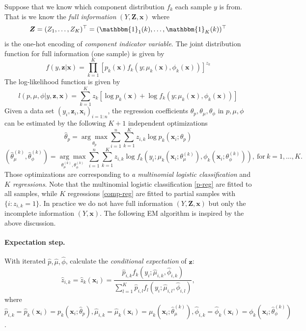 \documentclass[11pt]{article}
\numberwithin{equation}{section}
\def\bx{\boldsymbol{x}}
\def\bZ{\boldsymbol{Z}}
\def\bz{\boldsymbol{z}}
\begin{document}
	Suppose that we know which component distribution $f_k$ each sample $y$ is from. That is we know the \textit{full information} $(Y,\bZ,\bx)$ where
	$$\bZ=(Z_1,\ldots,Z_K)^\top=(\mathbbm{1}_1(k),\ldots,\mathbbm{1}_K(k))^\top$$
	is the one-hot encoding of \textit{component indicator variable}.
	The joint distribution function for full information (one sample) is given by
	$$f(y,\bz|
	\bx) = \prod_{k=1}^K\left[p_k(\bx)f_k(y;\mu_k(\bx),\phi_k(\bx))\right]^{z_k}$$
	The {log-likelihood function} is given by
	\begin{equation}\label{full-L}
		l(p,\mu,\phi|y,\bz,\bx)=\sum_{k=1}^K z_k\left[\log p_k(\bx) + \log f_k(y;\mu_k(\bx),\phi_k(\bx))\right]
	\end{equation}
	Given a data set $(y_i,\bz_i,\bx_i)_{i=1:n}$, the regression coefficients $\theta_p, \theta_\mu, \theta_\phi$ in $p,\mu,\phi$ can be estimated by the following $K+1$ {independent optimizations}
	\begin{equation}\label{p-reg}
		\hat{\theta}_p=\underset{\theta_p}{\arg\max}\sum_{i=1}^n\sum_{k=1}^Kz_{i,k}\log p_k(\bx_i;\theta_p)
	\end{equation}
	\begin{equation}\label{comp-reg}
		\left(\hat{\theta}_\mu^{(k)},\hat{\theta}_\phi^{(k)}\right)=\underset{\theta^{(k)}_\mu,\theta^{(k)}_\phi}{\arg\max}\sum_{i=1}^n\sum_{k=1}^Kz_{i,k}\log f_k\left(y_i;\mu_k\left(\bx_i;\theta_\mu^{(k)}\right),\phi_k\left(\bx_i;\theta_\phi^{(k)}\right)\right), ~\text{for} ~ k=1,\ldots,K.
	\end{equation}
	Those optimizations are corresponding to  {\it a multinomial logistic classification} and {\it $K$ regressions}.
Note that the multinomial logistic classification \eqref{p-reg} are fitted to all samples, while $K$ regressions \eqref{comp-reg} are fitted to {partial} samples with $\{i:z_{i,k}=1\}$.
In practice we do not have full information  $(Y,\bZ,\bx)$ but only the incomplete information $(Y,\bx)$. The following EM algorithm is inspired by the above discussion.
\paragraph{Expectation step.}
	With iterated $\hat{p},\hat{\mu},\hat{\phi}$, calculate the \textit{conditional expectation} of $\bz$:
	$$\hat{z}_{i,k}=\hat{z}_k(\bx_i)=\frac{\hat{p}_{i,k}f_k(y_i;\hat{\mu}_{i,k},\hat{\phi}_{i,k})}{\sum_{l=1}^K\hat{p}_{i,l}f_l(y_i;\hat{\mu}_{i,l},\hat{\phi}_{i,l})},$$
	where
	$\hat{p}_{i,k}=\hat{p}_k(\bx_i)= p_k(\bx_i;\hat{\theta}_p),\hat{\mu}_{i,k}=\hat{\mu}_k(\bx_i)=\mu_k\left(\bx_i;\hat{\theta}_\mu^{(k)}\right),\hat{\phi}_{i,k}=\hat{\phi}_k(\bx_i)=\phi_k\left(\bx_i;\hat{\theta}_\phi^{(k)}\right)$.
\end{document}
